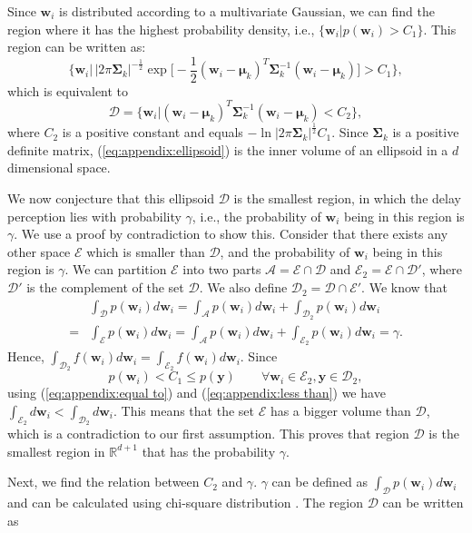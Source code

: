 \documentclass[journal,draftclsnofoot,onecolumn,12pt]{IEEEtran}%
\newcommand{\mub}{\boldsymbol{\mu}}
\newcommand{\Sigmab}{\boldsymbol{\Sigma}}
\newcommand{\Db}{\mathcal{D}}
\newcommand{\Ab}{\mathcal{A}}
\newcommand{\Eb}{\mathcal{E}}
\newcommand{\wb}{\boldsymbol{w}}
\begin{document}
	
	Since $\wb_i$ is distributed according to a multivariate Gaussian, we can find the region where it has the highest probability density, i.e.,  {$\big\{\wb_i|p(\wb_i)>C_1\big\}$}. This region can be written as:
	\begin{equation}
	\bigg\{\wb_i \bigg|	\,|2\pi \Sigmab_k|^{-\frac{1}{2}} \exp\Big[-\frac{1}{2}(\wb_i-\mub_k)^T\Sigmab_k^{-1}(\wb_i-\mub_k)\Big]>C_1 \bigg\},
	\end{equation}
	which is equivalent to
	\begin{equation}
	\label{eq:appendix:ellipsoid}
	\Db=\Big\{\wb_i\Big|(\wb_i-\mub_k)^T\Sigmab_k^{-1}(\wb_i-\mub_k)<C_2\Big\},
	\end{equation}
	where $C_2$ is a positive constant and equals  $-\ln |2 \pi\Sigmab_k|^{\frac{1}{2}} C_1$. Since $\Sigmab_k$ is a positive definite matrix, (\ref{eq:appendix:ellipsoid}) is the inner volume of an ellipsoid in a $d$ dimensional space. 
	
	We now conjecture that this ellipsoid $\Db$ is the smallest region, in which the delay perception lies with probability $\gamma$, i.e., the probability of $\wb_i$ being in this region is $\gamma$. We use a proof by contradiction to show this. Consider that there exists any other space $\Eb$ which is smaller than $\Db$, and the probability of $\wb_i$ being in this region is $\gamma$. We can partition $\Eb$ into two parts $\Ab=\Eb \cap \Db$ and $\Eb_2=\Eb \cap \Db'$, where $\Db'$ is the complement of the set $\Db$. We also define $\Db_2=\Db \cap \Eb'$. We know that
	{\begin{align}
	&\int_\Db p(\wb_i) d\wb_i=\int_{\Ab} p(\wb_i) d\wb_i+\int_{\Db_2} p(\wb_i) d\wb_i \\
	=&\int_\Eb p(\wb_i) d\wb_i=\int_{\Ab} p(\wb_i) d\wb_i+\int_{\Eb_2} p(\wb_i) d\wb_i	=\gamma.
	\end{align}}
	Hence, $\int_{\Db_2} f(\wb_i) d\wb_i=\int_{\Eb_2} f(\wb_i) d\wb_i$.  Since
	{\begin{equation}
	p(\wb_i)<C_1\leq p(\boldsymbol{y}) \qquad \forall \wb_i \in \Eb_2, \boldsymbol{y} \in \Db_2,
	\end{equation} }
	using (\ref{eq:appendix:equal to}) and (\ref{eq:appendix:less than}) we have 
	$
	\int_{\Eb_2}  d\wb_i<\int_{\Db_2}  d\wb_i.
	$
	This means that the set $\Eb$ has a bigger volume than $\Db$, which is a contradiction to our first assumption.  This proves that region $\Db$ is the smallest region in $\mathds{R}^{d+1}$ that has the probability $\gamma$.
	
	Next, we find the relation between $C_2$ and $\gamma$.  
	$\gamma$ can be defined as {$\int_\Db p(\wb_i) d\wb_i$} and can be calculated using chi-square distribution \cite{berger1980robust}. The region $\Db$ can be written as
	
\end{document}
